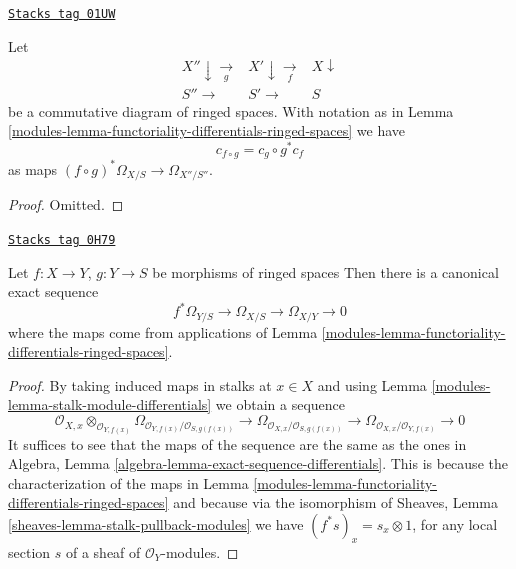 \begin{lemma}
\label{modules-lemma-check-functoriality-differentials}
\href{https://stacks.math.columbia.edu/tag/01UW}{\texttt{Stacks tag 01UW}}

Let
$$
\begin{array}{ccc}X'' \downarrow\underset{g}{\longrightarrow} & X' \downarrow\underset{f}{\longrightarrow} & X \downarrow \\ S'' \longrightarrow & S' \longrightarrow & S\end{array}
$$
be a commutative diagram of ringed spaces. With notation as in
Lemma \ref{modules-lemma-functoriality-differentials-ringed-spaces} we have
$$
c_{f \circ g} = c_g \circ g^* c_f
$$
as maps $(f \circ g)^*\Omega_{X/S} \to \Omega_{X''/S''}$.
\end{lemma}

\begin{proof}
Omitted.
\end{proof}

\begin{lemma}
\label{modules-lemma-triangle-differentials}
\href{https://stacks.math.columbia.edu/tag/0H79}{\texttt{Stacks tag 0H79}}

Let $f : X \to Y$, $g : Y \to S$ be morphisms of ringed spaces
Then there is a canonical exact sequence
$$
f^*\Omega_{Y/S} \to \Omega_{X/S} \to \Omega_{X/Y} \to 0
$$
where the maps come from applications of
Lemma \ref{modules-lemma-functoriality-differentials-ringed-spaces}.
\end{lemma}

\begin{proof}

By taking induced maps in stalks at $x \in X$ and using
Lemma \ref{modules-lemma-stalk-module-differentials} we obtain a sequence
$$
\mathcal{O}_{X, x} \otimes_{\mathcal{O}_{Y, f(x)}}
\Omega_{\mathcal{O}_{Y, f(x)}/\mathcal{O}_{S, g(f(x))}} \to
\Omega_{\mathcal{O}_{X, x}/\mathcal{O}_{S, g(f(x))}} \to
\Omega_{\mathcal{O}_{X, x}/\mathcal{O}_{Y, f(x)}} \to 0
$$
It suffices to see that the maps of the sequence are the same as
the ones in Algebra, Lemma \ref{algebra-lemma-exact-sequence-differentials}.
This is because the characterization of the maps in
Lemma \ref{modules-lemma-functoriality-differentials-ringed-spaces}
and because via the isomorphism of
Sheaves, Lemma \ref{sheaves-lemma-stalk-pullback-modules}
we have $(f^*s)_x = s_x \otimes 1$,
for any local section $s$ of a sheaf of $\mathcal{O}_Y$-modules.
\end{proof}

